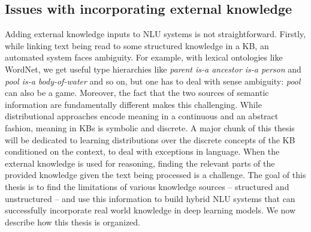 \subsection{Issues with incorporating external knowledge}
Adding external knowledge inputs to NLU systems is not straightforward.  Firstly, while linking text being read to some structured knowledge
in a KB, an automated system faces ambiguity. For example, with lexical ontologies like WordNet, 
we get useful type hierarchies like \textit{parent is-a ancestor is-a person} and \textit{pool is-a body-of-water} 
and so on, but one has to deal with sense ambiguity: \textit{pool} can also be a game. Moreover, the fact that the two sources of semantic information are fundamentally different 
makes this challenging. While distributional approaches encode meaning in a
continuous and an abstract fashion, meaning in KBs is symbolic and discrete. A major chunk of this thesis will be dedicated to learning 
distributions over the discrete concepts of the KB conditioned on the context, to deal with exceptions in language.
When the external knowledge is used for reasoning, finding the 
relevant parts of the provided knowledge given the text being processed is a challenge. 
The goal of this thesis is to find the limitations of various knowledge sources -- structured and unstructured -- and use this information 
to build hybrid NLU systems that can successfully incorporate real world knowledge in deep learning models. We now describe how this thesis is organized.

